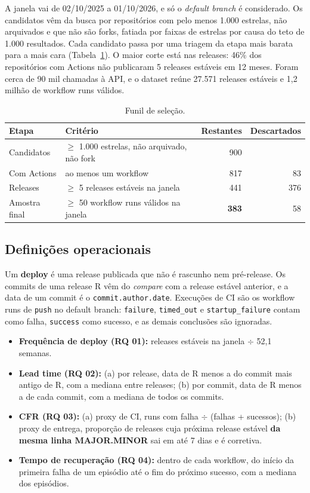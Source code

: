\documentclass[12pt]{article}
\begin{document}
A janela vai de 02/10/2025 a 01/10/2026, e só o \textit{default branch} é considerado. Os candidatos vêm da busca por repositórios com pelo menos 1.000 estrelas, não arquivados e que não são forks, fatiada por faixas de estrelas por causa do teto de 1.000 resultados. Cada candidato passa por uma triagem da etapa mais barata para a mais cara (Tabela~\ref{tab:funil}). O maior corte está nas releases: 46\% dos repositórios com Actions não publicaram 5 releases estáveis em 12 meses. Foram cerca de 90 mil chamadas à API, e o dataset reúne 27.571 releases estáveis e 1,2 milhão de workflow runs válidos.

\begin{table}[ht]
\centering
\caption{Funil de seleção.}
\label{tab:funil}
\small
\begin{tabular}{llrr}
\hline
Etapa & Critério & Restantes & Descartados \\
\hline
Candidatos & $\geq$ 1.000 estrelas, não arquivado, não fork & 900 & \\
Com Actions & ao menos um workflow & 817 & 83 \\
Releases & $\geq$ 5 releases estáveis na janela & 441 & 376 \\
Amostra final & $\geq$ 50 workflow runs válidos na janela & \textbf{383} & 58 \\
\hline
\end{tabular}
\end{table}

\subsection{Definições operacionais}

Um \textbf{deploy} é uma release publicada que não é rascunho nem pré-release. Os commits de uma release R vêm do \textit{compare} com a release estável anterior, e a data de um commit é o \texttt{commit.author.date}. Execuções de CI são os workflow runs de \texttt{push} no default branch: \texttt{failure}, \texttt{timed\_out} e \texttt{startup\_failure} contam como falha, \texttt{success} como sucesso, e as demais conclusões são ignoradas.

\begin{itemize}
\item \textbf{Frequência de deploy (RQ 01):} releases estáveis na janela $\div$ 52,1 semanas.
\item \textbf{Lead time (RQ 02):} (a) por release, data de R menos a do commit mais antigo de R, com a mediana entre releases; (b) por commit, data de R menos a de cada commit, com a mediana de todos os commits.
\item \textbf{CFR (RQ 03):} (a) proxy de CI, runs com falha $\div$ (falhas + sucessos); (b) proxy de entrega, proporção de releases cuja próxima release estável \textbf{da mesma linha MAJOR.MINOR} sai em até 7 dias e é corretiva.
\item \textbf{Tempo de recuperação (RQ 04):} dentro de cada workflow, do início da primeira falha de um episódio até o fim do próximo sucesso, com a mediana dos episódios.
\end{itemize}
\end{document}
